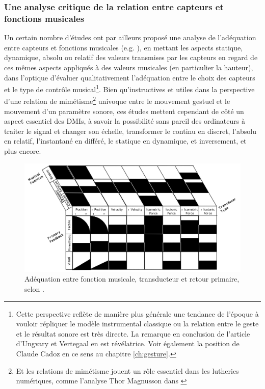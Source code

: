 \subsubsection{Une analyse critique de la relation entre capteurs et fonctions musicales}

\noindent Un certain nombre d'études ont par ailleurs proposé une analyse de l'adéquation entre capteurs et fonctions musicales (e.g. \cite{vertegaal_towards_1996, goudeseune_interpolated_2002}), en mettant les aspects statique, dynamique, absolu ou relatif des valeurs transmises par les capteurs en regard de ces mêmes aspects appliqués à des valeurs musicales (en particulier la hauteur), dans l'optique d'évaluer qualitativement l'adéquation entre le choix des capteurs et le type de contrôle musical\footnote{Cette perspective reflète de manière plus générale une tendance de l'époque à vouloir répliquer le modèle instrumental classique ou la relation entre le geste et le résultat sonore est très directe. La remarque en conclusion de l'article d'Ungvary et Vertegaal  en est révélatrice. Voir également la position de Claude Cadoz en ce sens au chapitre \ref{ch:gesture}.}. Bien qu'instructives et utiles dans la perspective d'une relation de mimétisme\footnote{Et les relations de mimétisme jouent un rôle essentiel dans les lutheries numériques, comme l'analyse Thor Magnusson dans \cite{magnusson_ergomimesis_2018}} univoque entre le mouvement gestuel et le mouvement d'un paramètre sonore, ces études mettent cependant de côté un aspect essentiel des \glspl{DMI}, à savoir la possibilité sans pareil des ordinateurs à traiter le signal et changer son échelle, transformer le continu en discret, l'absolu en relatif, l'instantané en différé, le statique en dynamique, et inversement, et plus encore.\\
\begin{figure}[!htbp]
	\captionsetup{format=plain}%
	\includegraphics[width=\textwidth]{gfx/05_interfaces/vertegaal-musical-function.png}
	\caption[Adéquation entre fonction musicale, transducteur et retour primaire]{Adéquation entre fonction musicale, transducteur et retour primaire, selon \cite{vertegaal_towards_1996}.}
	\label{fig:interface:vertegaal-transducer-function}
\end{figure}
